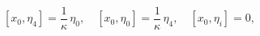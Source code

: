 \begin{equation}\label{25}
  [x_0,\eta_4] = \frac{1}\kappa\, \eta_0, \quad [x_0,\eta_0]
= \frac{1}\kappa\, \eta_4, \quad [x_0,\eta_i] = 0,
\end{equation}

